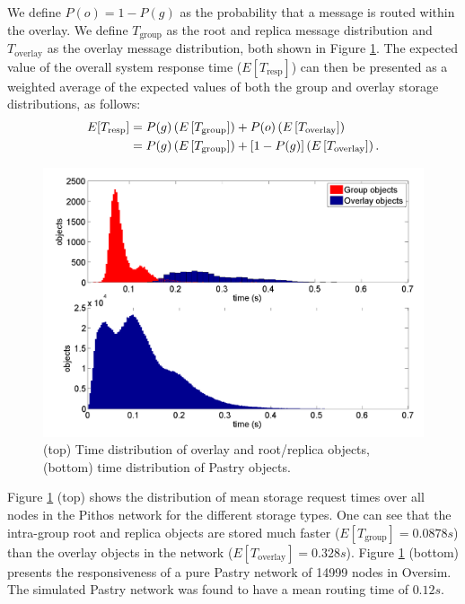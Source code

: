 \documentclass[10pt,a4paper,conference]{IEEEtran}
\begin{document}
We define $P(o) = 1 - P(g)$ as the probability that a message is routed within the overlay. We define $T_{\textrm{group}}$ as the root and replica
message distribution and $T_{\textrm{overlay}}$ as the overlay message distribution, both shown in Figure \ref{fig_pithos_response}. The expected
value of the overall system response time ($E[T_{\textrm{resp}}]$) can then be presented as a weighted average of the expected values of both the
group and overlay storage distributions, as follows:
%
\begin{align}
    E[T_{\textrm{resp}}] &= P(g)\left(E\left[T_{\textrm{group}}\right]\right) + P(o)\left(E\left[T_{\textrm{overlay}}\right]\right)\notag\\
                         &= P(g)\left(E\left[T_{\textrm{group}}\right]\right) + \left[1 - P(g)\right]\left(E\left[T_{\textrm{overlay}}\right]\right).\label{expected_response_time}
\end{align}

\begin{figure}[htbp]
 \centering
 \includegraphics[clip=true, viewport=1cm 0.5cm 29cm 20.5cm, width=\columnwidth]{StoreTimes}
 \caption{(top) Time distribution of overlay and root/replica objects, (bottom) time distribution of Pastry objects.}
 \label{fig_pithos_response}
\end{figure}
%
Figure \ref{fig_pithos_response} (top) shows the distribution of mean storage request times over all nodes in the Pithos network for the different
storage types. One can see that the intra-group root and replica objects are stored much faster ($E\left[T_{\textrm{group}}\right] = 0.0878s$) than
the overlay objects in the network ($E\left[T_{\textrm{overlay}}\right] = 0.328s$). Figure \ref{fig_pithos_response} (bottom) presents the
responsiveness of a pure Pastry network of 14999 nodes in Oversim. The simulated Pastry network was found to have a mean routing time of $0.12s$.
\end{document}
